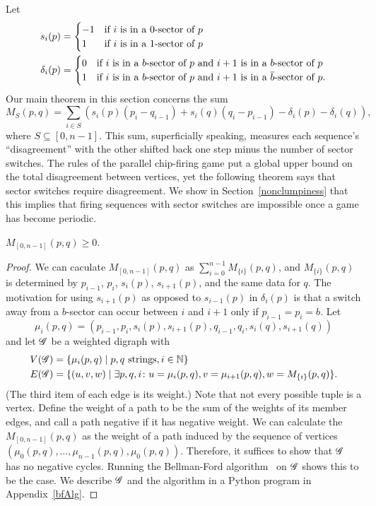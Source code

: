 Let
\begin{align*}
  s_i(p) &= \begin{cases}
    -1 & \text{if $i$ is in a 0-sector of $p$} \\
    1 & \text{if $i$ is in a 1-sector of $p$}
  \end{cases} \\
  \delta_i(p) &= \begin{cases}
    0 & \text{if $i$ is in a $b$-sector of $p$ and $i+1$ is in a $b$-sector of
      $p$} \\
    1 & \text{if $i$ is in a $b$-sector of $p$ and $i+1$ is in a
      $\overline{b}$-sector of $p$}.
  \end{cases}
\end{align*}
Our main theorem in this section concerns the sum
\begin{equation}\label{misbsum}
  M_S(p,q) = \sum_{i \in S}(s_i(p)(p_i - q_{i-1}) + s_i(q)(q_i - p_{i-1}) -
  \delta_i(p) - \delta_i(q)),
\end{equation}
where $S \subseteq [0, n-1]$. This sum, superficially speaking, measures each
sequence's ``disagreement'' with the other shifted back one step minus the
number of sector switches. The rules of the parallel chip-firing game put a
global upper bound on the total disagreement between vertices, yet the
following theorem says that sector switches require disagreement. We show in
Section~\ref{nonclumpiness} that this implies that firing sequences with sector
switches are impossible once a game has become periodic.

\begin{thm}\label{morale}
$M_{[0,n-1]}(p,q) \geq 0$.
\end{thm}

\begin{proof}
We can caculate $M_{[0,n-1]}(p,q)$ as $\sum_{i=0}^{n-1}M_{\{i\}}(p,q)$, and
$M_{\{i\}}(p,q)$ is determined by $p_{i-1}$, $p_i$, $s_i(p)$, $s_{i+1}(p)$, and
the same data for $q$. The motivation for using $s_{i+1}(p)$ as opposed to
$s_{i-1}(p)$ in $\delta_i(p)$ is that a switch away from a $b$-sector can occur
between $i$ and $i+1$ only if $p_{i-1} = p_i = b$. Let
\[
  \mu_i(p,q) = (p_{i-1},p_i,s_i(p),s_{i+1}(p),q_{i-1},q_i,s_i(q),s_{i+1}(q))
\]
and let $\mathscr{G}$ be a weighted digraph with
\begin{align*}
  \V[\G] &= \set{\mu_i(p,q)}{p,q \text{ strings}, i \in \nats} \\
  \E[\G] &= \set{(u,v,w)}{\exists p,q,i\colon
    u = \mu_i(p,q),
    v = \mu_{i+1}(p,q),
    w = M_{\{i\}}(p,q)}.
\end{align*}
(The third item of each edge is its weight.) Note that not every possible tuple
is a vertex. Define the weight of a path to be the sum of the weights of its
member edges, and call a path negative if it has negative weight. We can
calculate the $M_{[0,n-1]}(p,q)$ as the weight of a path induced by the
sequence of vertices $(\mu_0(p,q), \dots, \mu_{n-1}(p,q),
\mu_0(p,q))$. Therefore, it suffices to show that $\mathscr{G}$ has no negative
cycles. Running the Bellman-Ford algorithm~\cite{bellmanford} on $\mathscr{G}$ shows
this to be the case. We describe $\mathscr{G}$ and the algorithm in a Python program in
Appendix~\ref{bfAlg}.
\end{proof}

